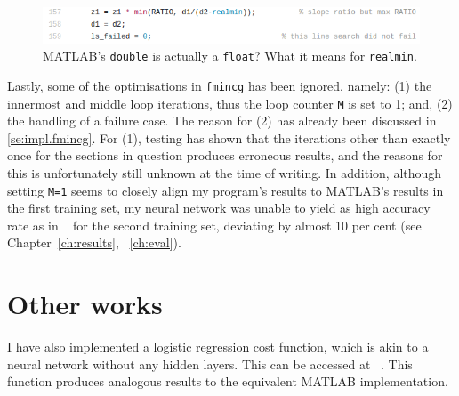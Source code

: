 \begin{figure}
	\centerline{\includegraphics[width=\linewidth]{realmin.png}}
	\caption{MATLAB's \texttt{double} is actually a \texttt{float}? What it means for \texttt{realmin}.}
	\label{fig:realmin}
\end{figure}

Lastly, some of the optimisations in \texttt{fmincg} has been ignored, namely: (1) the innermost and middle loop iterations, thus the loop counter \texttt{M} is set to 1; and, (2) the handling of a failure case. The reason for (2) has already been discussed in \ref{se:impl.fmincg}. For (1), testing has shown that the iterations other than exactly once for the sections in question produces erroneous results, and the reasons for this is unfortunately still unknown at the time of writing. In addition, although setting \texttt{M=1} seems to closely align my program's results to MATLAB's results in the first training set, my neural network was unable to yield as high accuracy rate as in ~\cite{LeC98} for the second training set, deviating by almost 10 per cent (see Chapter~\ref{ch:results}, ~\ref{ch:eval}).

\section{Other works}
I have also implemented a logistic regression cost function, which is akin to a neural network without any hidden layers. This can be accessed at ~\cite{McDJeo}. This function produces analogous results to the equivalent MATLAB implementation.
